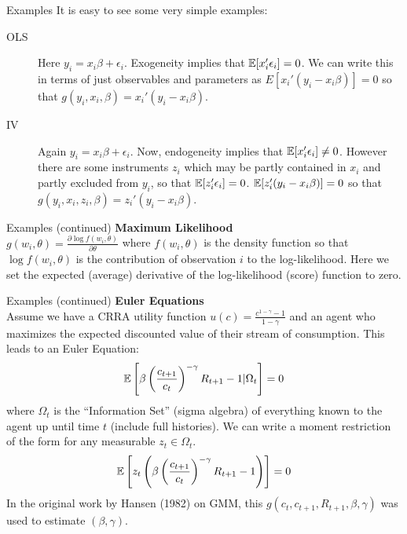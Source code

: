 \begin{frame}{Examples}
It is easy to see some very simple examples:
\begin{description} 
\item[OLS] Here $y_i = x_i \beta + \epsilon_i$. Exogeneity implies that $\mathbb{E}[x_i' \epsilon_i]=0$. We can write this in terms of just observables and parameters as $E[x_i' (y_i - x_i \beta)]=0$ so that $g(y_i,x_i, \beta) = x_i' (y_i - x_i \beta)$.
\item[IV]  Again $y_i = x_i \beta + \epsilon_i$. Now, endogeneity implies that $\mathbb{E}[x_i' \epsilon_i]\neq0$. However there are some instruments $z_i$ which may be partly contained in $x_i$ and partly excluded from $y_i$, so that $\mathbb{E}[z_i' \epsilon_i]=0$. $\mathbb{E}[z_i' (y_i - x_i \beta)]=0$ so that $g(y_i,x_i,z_i, \beta) = z_i' (y_i - x_i \beta)$.
\end{description}
\end{frame}

\begin{frame}{Examples (continued)}
\textbf{Maximum Likelihood}\\
 $g(w_i,\theta) =  \frac{\partial \log f(w_i,\theta)}{\partial \theta}$ where $f(w_i,\theta)$ is the density function so that $\log f(w_i,\theta)$ is the contribution of observation $i$ to the log-likelihood. Here we set the expected (average) derivative of the log-likelihood (score) function to zero.
\end{frame}


\begin{frame}{Examples (continued)}
\textbf{Euler Equations}\\
Assume we have a CRRA utility function $u(c) = \frac{c^{1-\gamma} -1}{1-\gamma}$ and an agent who maximizes the expected discounted value of their stream of consumption. This leads to an Euler Equation:
\begin{eqnarray*}
\mathbb{E} \left[\beta \left( \frac{c_{t+1}}{c_t} \right)^{-\gamma} R_{t+1} -1 | \Omega_t \right] =0
\end{eqnarray*}
where $\Omega_t$ is the ``Information Set'' (sigma algebra) of everything known to the agent up until time $t$ (include full histories). We can write a moment restriction of the form for any measurable $z_t \in \Omega_t$.
\begin{eqnarray*}
\mathbb{E} \left[z_t \left(\beta  \left( \frac{c_{t+1}}{c_t} \right)^{-\gamma} R_{t+1} -1\right) \right] =0
\end{eqnarray*}
In the original work by Hansen (1982) on GMM, this $g(c_t,c_{t+1},R_{t+1},\beta,\gamma)$ was used to estimate $(\beta,\gamma)$.
\end{frame}

